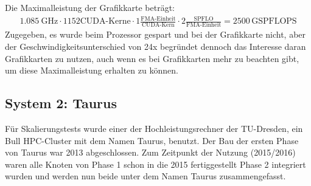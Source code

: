 Die Maximalleistung der Grafikkarte beträgt:
\begin{align}
	\SI{1.085}{\giga\hertz} \cdot 1152 \text{CUDA-Kerne} \cdot
	1 \frac{ \text{FMA-Einheit} }{ \text{CUDA-Kern} } \cdot
	2 \frac{ \text{SPFLO} }{ \text{FMA-Einheit} }
	= 2500\,\text{GSPFLOPS}
\end{align}
Zugegeben, es wurde beim Prozessor gespart und bei der Grafikkarte nicht, aber der Geschwindigkeitsunterschied von 24x begründet dennoch das Interesse daran Grafikkarten zu nutzen, auch wenn es bei Grafikkarten mehr zu beachten gibt, um diese Maximalleistung erhalten zu können.


\subsection{System 2: Taurus}
\label{sct:system2}

Für Skalierungstests wurde einer der Hochleistungsrechner der TU-Dresden, ein Bull HPC-Cluster mit dem Namen Taurus, benutzt. Der Bau der ersten Phase von Taurus war 2013 abgeschlossen\cite{taurusnutzerschulung}. Zum Zeitpunkt der Nutzung (2015/2016) waren alle Knoten von Phase 1 schon in die 2015 fertiggestellt\cite{heisehrsk2} Phase 2 integriert wurden\cite{doctudtaurushardware} und werden nun beide unter dem Namen Taurus zusammengefasst.

